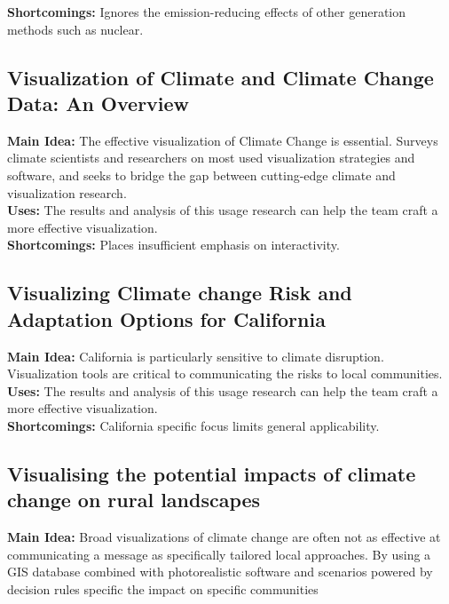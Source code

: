 \documentclass[sigconf,nonacm=true]{acmart}
\begin{document}
\textbf{Shortcomings:}  Ignores the emission-reducing effects of other generation methods such as nuclear. \\

\subsection{Visualization of Climate and Climate Change Data: An Overview \cite[Page Count:~6]{Overview_article}}
\textbf{Main Idea:}  The effective visualization of Climate Change is essential. Surveys climate scientists and researchers on most used visualization strategies and software, and seeks to bridge the gap between cutting-edge climate and visualization research. \\

\textbf{Uses:}  The results and analysis of this usage research can help the team craft a more effective visualization.\\

\textbf{Shortcomings:}  Places insufficient emphasis on interactivity.\\

\subsection{Visualizing Climate change Risk and Adaptation Options for California \cite[Page Count:~24]{California_Report}}
\textbf{Main Idea:}  California is particularly sensitive to climate disruption. Visualization tools are critical to communicating the risks to local communities. \\

\textbf{Uses:} The results and analysis of this usage research can help the team craft a more effective visualization.  \\

\textbf{Shortcomings:} California specific focus limits general applicability. \\

\subsection{Visualising the potential impacts of climate change on rural landscapes \cite[Page Count:~23]{Rural_Landscape_DockertyTrudie2005Vtpi}}
\textbf{Main Idea:}  Broad visualizations of climate change are often not as effective at communicating a message as specifically tailored local approaches. By using a GIS database combined with photorealistic software and scenarios powered by decision rules specific the impact on specific communities \\
\end{document}
